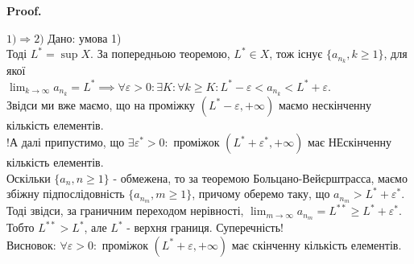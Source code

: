 \documentclass[a4paper, 14pt]{article}
\makeatletter
\def\qed{$\blacksquare$}
\theoremstyle{theoremdd}
\theoremstyle{theoremdd}
\theoremstyle{theoremdd}
\theoremstyle{theoremdd}
\theoremstyle{theoremdd}
\theoremstyle{theoremdd}
\theoremstyle{theoremdd}
\theoremstyle{theoremdd}
\renewenvironment{proof}[1][Proof.\\]{\par
\pushQED{\hfill \qed}%
\normalfont \topsep6\p@\@plus6\p@\relax
\trivlist
\item\relax
{\bfseries
#1\@addpunct{.}}\hspace\labelsep\ignorespaces
}{%
\popQED\endtrivlist\@endpefalse
}
\makeatother
\begin{document}
	\begin{proof}
	$\boxed{1) \Rightarrow 2)}$ Дано: умова 1)\\
	Тоді $L^* = \displaystyle \sup X$. За попередньою теоремою, $L^* \in X$, тож існує $\{a_{n_k}, k \geq 1\}$, для якої \\ $\displaystyle \lim_{k \to \infty} a_{n_k} = L^* \implies \forall \varepsilon > 0: \exists K: \forall k \geq K: L^*-\varepsilon < a_{n_k} < L^*+\varepsilon$.\\
	Звідси ми вже маємо, що на проміжку $(L^*-\varepsilon, +\infty)$ маємо нескінченну кількість елементів.\\
	!А далі припустимо, що $\exists \varepsilon^* > 0:$ проміжок $(L^*+\varepsilon^*, + \infty)$ має НЕскінченну кількість елементів.\\
	Оскільки $\{a_n, n \geq 1\}$ - обмежена, то за теоремою Больцано-Вейєрштрасса, маємо збіжну підпослідовність $\{a_{n_m}, m \geq 1\}$, причому оберемо таку, що  $a_{n_m} > L^* + \varepsilon^*$.\\
	Тоді звідси, за граничним переходом нерівності, $\displaystyle \lim_{m \to \infty} a_{n_m} = L^{**} \geq L^* + \varepsilon^*$. \\ 
	Тобто $L^{**} > L^*$, але $L^*$ - верхня границя. Суперечність!\\
	Висновок: $\forall \varepsilon > 0:$ проміжок $(L^*+\varepsilon, + \infty)$ має скінченну кількість елементів.
	\bigskip \\
	

\end{proof}
\end{document}
